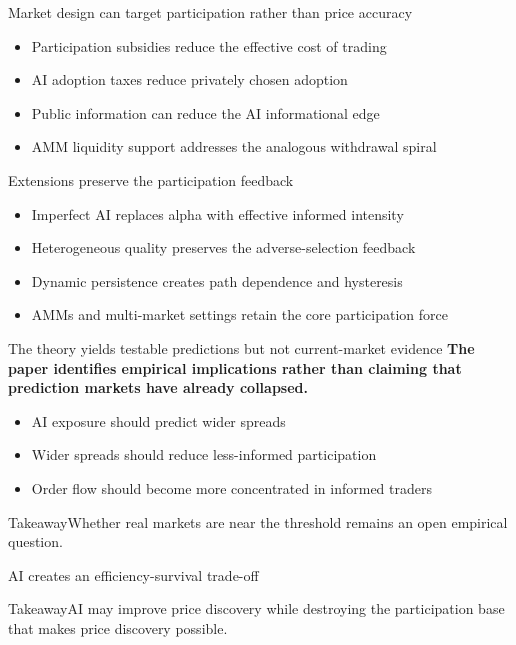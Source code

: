 \documentclass[aspectratio=169,14pt]{beamer}
\begin{document}
\begin{frame}{Market design can target participation rather than price accuracy}
\begin{itemize}
  \item Participation subsidies reduce the effective cost of trading
  \item AI adoption taxes reduce privately chosen adoption
  \item Public information can reduce the AI informational edge
  \item AMM liquidity support addresses the analogous withdrawal spiral
\end{itemize}
\end{frame}

\begin{frame}{Extensions preserve the participation feedback}
\begin{itemize}
  \item Imperfect AI replaces alpha with effective informed intensity
  \item Heterogeneous quality preserves the adverse-selection feedback
  \item Dynamic persistence creates path dependence and hysteresis
  \item AMMs and multi-market settings retain the core participation force
\end{itemize}
\end{frame}

\begin{frame}{The theory yields testable predictions but not current-market evidence}
\textbf{The paper identifies empirical implications rather than claiming that prediction markets have already collapsed.}
\begin{itemize}
  \item AI exposure should predict wider spreads
  \item Wider spreads should reduce less-informed participation
  \item Order flow should become more concentrated in informed traders
\end{itemize}
\begin{block}{Takeaway}Whether real markets are near the threshold remains an open empirical question.\end{block}
\end{frame}

\begin{frame}{AI creates an efficiency-survival trade-off}
\vfill
\begin{block}{Takeaway}AI may improve price discovery while destroying the participation base that makes price discovery possible.\end{block}
\vfill
\end{frame}
\end{document}
